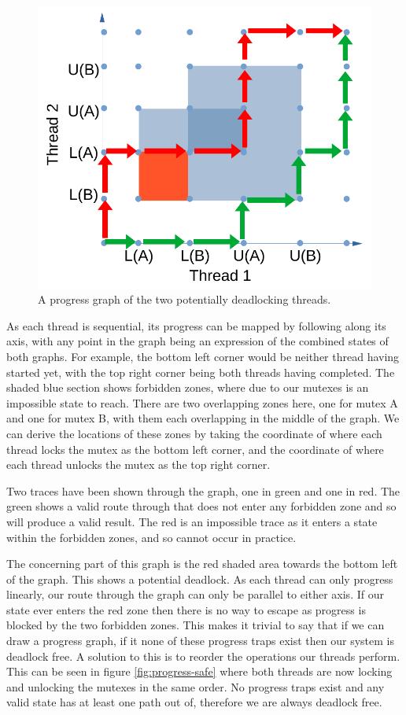 \begin{figure}
  \centering
  \includegraphics[width=\textwidth]{img/progress-deadlock.pdf}
  \caption{A progress graph of the two potentially deadlocking threads.}
  \label{fig:progress-deadlock}
\end{figure}

As each thread is sequential, its progress can be mapped by following along its axis, with any point in the graph being an expression of the combined states of both graphs. For example, the bottom left corner would be neither thread having started yet, with the top right corner being both threads having completed. The shaded blue section shows forbidden zones, where due to our mutexes is an impossible state to reach. There are two overlapping zones here, one for mutex A and one for mutex B, with them each overlapping in the middle of the graph. We can derive the locations of these zones by taking the coordinate of where each thread locks the mutex as the bottom left corner, and the coordinate of where each thread unlocks the mutex as the top right corner.

Two traces have been shown through the graph, one in green and one in red. The green shows a valid route through that does not enter any forbidden zone and so will produce a valid result. The red is an impossible trace as it enters a state within the forbidden zones, and so cannot occur in practice.

The concerning part of this graph is the red shaded area towards the bottom left of the graph. This shows a potential deadlock. As each thread can only progress linearly, our route through the graph can only be parallel to either axis. If our state ever enters the red zone then there is no way to escape as progress is blocked by the two forbidden zones. This makes it trivial to say that if we can draw a progress graph, if it none of these progress traps exist then our system is deadlock free. A solution to this is to reorder the operations our threads perform. This can be seen in figure \ref{fig:progress-safe} where both threads are now locking and unlocking the mutexes in the same order. No progress traps exist and any valid state has at least one path out of, therefore we are always deadlock free.

